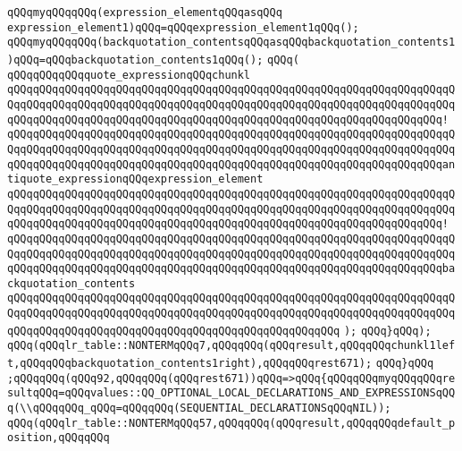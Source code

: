 \verb|qQQqmyqQQqqQQq(expression_elementqQQqasqQQq|\newline
\verb|expression_element1)qQQq=qQQqexpression_element1qQQq();|\newline
\verb|qQQqmyqQQqqQQq(backquotation_contentsqQQqasqQQqbackquotation_contents1)qQQq=qQQqbackquotation_contents1qQQq();|\newline
\verb|qQQq(|\newline
\verb|qQQqqQQqqQQqquote_expressionqQQqchunkl|\newline
\verb|qQQqqQQqqQQqqQQqqQQqqQQqqQQqqQQqqQQqqQQqqQQqqQQqqQQqqQQqqQQqqQQqqQQqqQQqqQQqqQQqqQQqqQQqqQQqqQQqqQQqqQQqqQQqqQQqqQQqqQQqqQQqqQQqqQQqqQQqqQQqqQQqqQQqqQQqqQQqqQQqqQQqqQQqqQQqqQQqqQQqqQQqqQQqqQQqqQQqqQQqqQQqqQQq!|\newline
\verb|qQQqqQQqqQQqqQQqqQQqqQQqqQQqqQQqqQQqqQQqqQQqqQQqqQQqqQQqqQQqqQQqqQQqqQQqqQQqqQQqqQQqqQQqqQQqqQQqqQQqqQQqqQQqqQQqqQQqqQQqqQQqqQQqqQQqqQQqqQQqqQQqqQQqqQQqqQQqqQQqqQQqqQQqqQQqqQQqqQQqqQQqqQQqqQQqqQQqqQQqqQQqqQQqantiquote_expressionqQQqexpression_element|\newline
\verb|qQQqqQQqqQQqqQQqqQQqqQQqqQQqqQQqqQQqqQQqqQQqqQQqqQQqqQQqqQQqqQQqqQQqqQQqqQQqqQQqqQQqqQQqqQQqqQQqqQQqqQQqqQQqqQQqqQQqqQQqqQQqqQQqqQQqqQQqqQQqqQQqqQQqqQQqqQQqqQQqqQQqqQQqqQQqqQQqqQQqqQQqqQQqqQQqqQQqqQQqqQQqqQQq!|\newline
\verb|qQQqqQQqqQQqqQQqqQQqqQQqqQQqqQQqqQQqqQQqqQQqqQQqqQQqqQQqqQQqqQQqqQQqqQQqqQQqqQQqqQQqqQQqqQQqqQQqqQQqqQQqqQQqqQQqqQQqqQQqqQQqqQQqqQQqqQQqqQQqqQQqqQQqqQQqqQQqqQQqqQQqqQQqqQQqqQQqqQQqqQQqqQQqqQQqqQQqqQQqqQQqqQQqbackquotation_contents|\newline
\verb|qQQqqQQqqQQqqQQqqQQqqQQqqQQqqQQqqQQqqQQqqQQqqQQqqQQqqQQqqQQqqQQqqQQqqQQqqQQqqQQqqQQqqQQqqQQqqQQqqQQqqQQqqQQqqQQqqQQqqQQqqQQqqQQqqQQqqQQqqQQqqQQqqQQqqQQqqQQqqQQqqQQqqQQqqQQqqQQqqQQqqQQqqQQqqQQq|\newline
\verb|);|\newline
\verb|qQQq}qQQq);|\newline
\verb|qQQq(qQQqlr_table::NONTERMqQQq7,qQQqqQQq(qQQqresult,qQQqqQQqchunkl1left,qQQqqQQqbackquotation_contents1right),qQQqqQQqrest671);|\newline
\verb|qQQq}qQQq|\newline
\verb|;qQQqqQQq(qQQq92,qQQqqQQq(qQQqrest671))qQQq=>qQQq{qQQqqQQqmyqQQqqQQqresultqQQq=qQQqvalues::QQ_OPTIONAL_LOCAL_DECLARATIONS_AND_EXPRESSIONSqQQq(\\qQQqqQQq_qQQq=qQQqqQQq(SEQUENTIAL_DECLARATIONSqQQqNIL));|\newline
\verb|qQQq(qQQqlr_table::NONTERMqQQq57,qQQqqQQq(qQQqresult,qQQqqQQqdefault_position,qQQqqQQq|\newline
